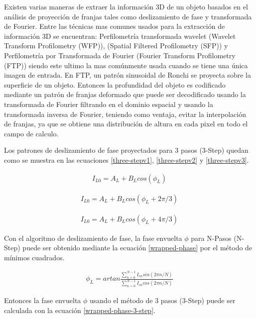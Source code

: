 \documentclass[10pt,letterpaper]{article}
\begin{document}
Existen varias maneras de extraer la información 3D de un objeto basados en el análisis de proyección de franjas tales como deslizamiento de fase y transformada de Fourier. Entre las técnicas mas comunes usados para la extracción de información 3D se encuentran: Perfilometría transformada wavelet (Wavelet Transform Profilometry (WFP)), (Spatial Filtered Profilometry (SFP)) y Perfilometría por Transformada de Fourier (Fourier Transform Profilometry (FTP)) siendo este ultimo la mas comúnmente usada cuando se tiene una única imagen de entrada. En FTP, un patrón sinusoidal de Ronchi se proyecta sobre la superficie de un objeto. Entonces la profundidad del objeto es codificado mediante un patrón de franjas deformado que puede ser decodificado usando la transformada de Fourier filtrando en el dominio espacial y usando la transformada inversa de Fourier, teniendo como ventaja, evitar la interpolación de franjas, ya que se obtiene una distribución de altura en cada pixel en todo el campo de calculo\cite{Su:Chen}. %

Los patrones de deslizamiento de fase proyectados para 3 pasos (3-Step) quedan como se muestra en las ecuaciones \ref{three-stepv1}, \ref{three-stepv2} y \ref{three-stepv3}.

\begin{eqnarray}
\label{three-stepv1}
I_{L0}=A_L+B_Lcos\left ( \phi _L \right )
\end{eqnarray}

\begin{eqnarray}
\label{three-stepv2}
I_{L0}=A_L+B_Lcos\left ( \phi _L +2\pi /3\right )
\end{eqnarray}

\begin{eqnarray}
\label{three-stepv3}
I_{L0}=A_L+B_Lcos\left ( \phi _L +4\pi /3\right )
\end{eqnarray}


Con el algoritmo de deslizamiento de fase, la fase envuelta $\phi$ para N-Pasos (N-Step)\cite{Schr:Brun} puede ser obtenido mediante la ecuación \ref{wrapped-phase} por el método de mínimos cuadrados. 

\begin{eqnarray}
\label{wrapped-phase}
\phi_L=artan\frac{\sum_{n=0}^{N-1}I_{cn}sin\left ( 2\pi n/N \right )}{\sum_{n=0}^{N-1}I_{cn}cos\left ( 2\pi n/N \right )} 
\end{eqnarray}

Entonces la fase envuelta $\phi$ usando el método de 3 pasos (3-Step) puede ser calculada con la ecuación \ref{wrapped-phase-3-step}.
\end{document}
